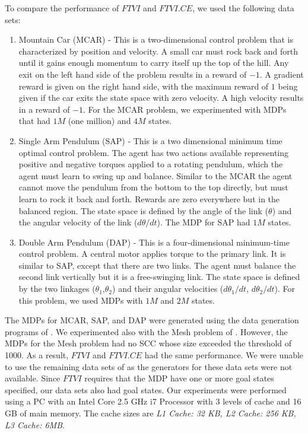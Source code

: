 \documentclass[conference]{IEEEtran}
\begin{document}
To compare the performance of $FTVI$ and $FTVI.CE$, we used the following data sets:
\begin{enumerate}
	\item Mountain Car (MCAR) - This is a two-dimensional control problem that is characterized by position and velocity. A small car must rock back and forth until it gains enough momentum to carry itself up the top of the hill. Any exit on the left hand side of the problem results in a reward of $-1$. A gradient reward is given on the right hand side, with the maximum reward of $1$ being given if the car exits the state space with zero velocity. A high velocity results in a reward of $-1$. For the MCAR problem, we experimented with MDPs that had $1M$ (one million) and $4M$ states.

\item Single Arm Pendulum (SAP) -  This is a two dimensional minimum time optimal control problem. The agent has two actions available representing positive and negative torques applied to a rotating pendulum, which the agent must learn to swing up and balance. Similar to the MCAR the agent cannot move the pendulum from the bottom to the top directly, but must learn to rock it back and forth. Rewards are zero everywhere but in the balanced region. The state space is defined by the angle of the link ($\theta$) and the angular velocity of the link ($d\theta/dt$). The MDP for SAP had $1M$ states.

\item Double Arm Pendulum (DAP) - This is a four-dimensional minimum-time control problem. A central motor applies torque to the primary link. It is similar to SAP, except that there are two links. The agent must balance the second link vertically but it is a free-swinging link. The state space is defined by the two linkages ($\theta_{1}$,$\theta_{2}$) and their angular velocities ($d\theta_{1}/dt$, $d\theta_{2}/dt$). For this problem, we used MDPs with $1M$ and $2M$ states.
\end{enumerate}

The MDPs for MCAR, SAP, and DAP were generated using the data generation programs of \cite{b11}. We experimented also with the Mesh problem of \cite{b11}. However, the MDPs for the Mesh problem had no SCC whose size exceeded the threshold of 1000. As a result, $FTVI$ and $FTVI.CE$ had the same performance. We were unable to use the remaining data sets of \cite{b10} as the generators for these data sets were not available.
Since $FTVI$ requires that the MDP have one or more goal states specified, our data sets also had goal states.
Our experiments were performed using a
PC with an Intel Core 2.5 GHz i7 Processor with 3 levels of cache and 16 GB of main memory.
The cache sizes are \textit{L1 Cache: 32 KB, L2 Cache: 256 KB, L3 Cache: 6MB}.
\end{document}
